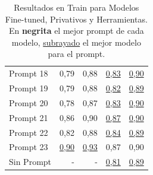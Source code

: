\begin{table}[H]
\begin{tabular}{l|rrrr}
Prompt 18 & 0,79 & 0,88 & \uline{0,83} & \uline{0,90} \\
Prompt 19 & 0,79 & 0,88 & \uline{0,82} & \uline{0,89} \\
Prompt 20 & 0,78 & 0,87 & \uline{0,83} & \uline{0,90} \\
Prompt 21 & 0,86 & 0,90 & \uline{0,87} & \uline{0,90} \\
Prompt 22 & 0,82 & 0,88 & \uline{0,84} & \uline{0,89} \\
Prompt 23 & \uline{0,90} & \uline{0,93} & 0,87 & 0,90 \\
\hline
Sin Prompt & - & - & \uline{0,81} & \uline{0,89} \\
\hline
\end{tabular}%
\caption{Resultados en Train para Modelos Fine-tuned, Privativos y Herramientas. En \textbf{negrita} el mejor prompt de cada modelo, \uline{subrayado} el mejor modelo para el prompt.}
\label{tab:resultados_6}
\end{table}

